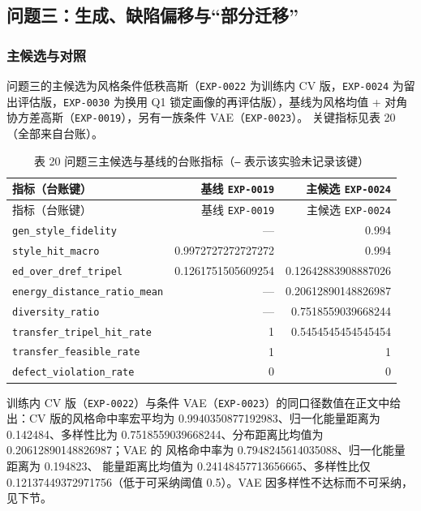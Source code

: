 \documentclass[
  a4paper,12pt]{article}
\begin{document}
\subsection{问题三：生成、缺陷偏移与``部分迁移''}\label{ux95eeux9898ux4e09ux751fux6210ux7f3aux9677ux504fux79fbux4e0eux90e8ux5206ux8fc1ux79fb}

\subsubsection{主候选与对照}\label{ux4e3bux5019ux9009ux4e0eux5bf9ux7167}

问题三的主候选为风格条件低秩高斯（\texttt{EXP-0022} 为训练内 CV
版，\texttt{EXP-0024} 为留出评估版，\texttt{EXP-0030} 为换用 Q1
锁定画像的再评估版），基线为风格均值 +
对角协方差高斯（\texttt{EXP-0019}），另有一族条件
VAE（\texttt{EXP-0023}）。 关键指标见表 20（全部来自台账）。

\begin{longtable}[]{@{}lrr@{}}
\caption{表 20 问题三主候选与基线的台账指标（\protect\texttt{—}
表示该实验未记录该键）}\tabularnewline
\toprule\noalign{}
指标（台账键） & 基线 \texttt{EXP-0019} & 主候选 \texttt{EXP-0024} \\
\midrule\noalign{}
\endfirsthead
\toprule\noalign{}
指标（台账键） & 基线 \texttt{EXP-0019} & 主候选 \texttt{EXP-0024} \\
\midrule\noalign{}
\endhead
\bottomrule\noalign{}
\endlastfoot
\texttt{gen\_style\_fidelity} & --- & 0.994 \\
\texttt{style\_hit\_macro} & 0.9972727272727272 & 0.994 \\
\texttt{ed\_over\_dref\_tripel} & 0.1261751505609254 &
0.12642883908887026 \\
\texttt{energy\_distance\_ratio\_mean} & --- & 0.20612890148826987 \\
\texttt{diversity\_ratio} & --- & 0.7518559039668244 \\
\texttt{transfer\_tripel\_hit\_rate} & 1 & 0.5454545454545454 \\
\texttt{transfer\_feasible\_rate} & 1 & 1 \\
\texttt{defect\_violation\_rate} & 0 & 0 \\
\end{longtable}

训练内 CV 版（\texttt{EXP-0022}）与条件
VAE（\texttt{EXP-0023}）的同口径数值在正文中给出：CV
版的风格命中率宏平均为 0.9940350877192983、归一化能量距离为
0.142484、多样性比为 0.7518559039668244、分布距离比均值为
0.20612890148826987；VAE 的 风格命中率为
0.7948245614035088、归一化能量距离为 0.194823、 能量距离比均值为
0.24148457713656665、多样性比仅 0.12137449372971756（低于可采纳阈值
0.5）。VAE 因多样性不达标而不可采纳，见下节。
\end{document}
